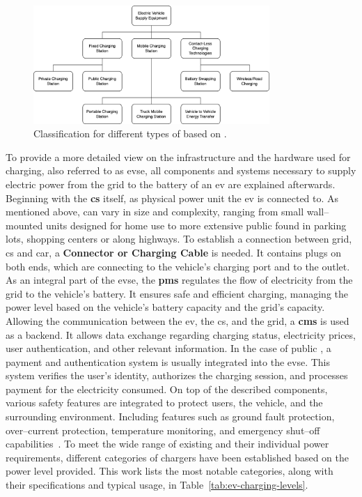 \begin{figure}[h]
\centering
\includegraphics[width=0.8\textwidth,keepaspectratio]{resources/images/main/1_fundamentals/ChargingStationClassification.png}
\caption{Classification for different types of  based on \cite{afshar_literature_2020}.}
\label{fig:charging-station-classification}
\end{figure}

\noindent To provide a more detailed view on the infrastructure and the hardware used for charging, also referred to as \acrfull{evse}, all components and systems necessary to supply electric power from the grid to the battery of an \acrfull{ev} are explained afterwards.
Beginning with the \textbf{\acrfull{cs}} itself, as physical power unit the \acrshort{ev} is connected to. As mentioned above,  can vary in size and complexity, ranging from small wall--mounted units designed for home use to more extensive public  found in parking lots, shopping centers or along highways. 
To establish a connection between grid, \acrshort{cs} and car, a \textbf{Connector or Charging Cable} is needed. It contains plugs on both ends, which are connecting to the vehicle's charging port and to the  outlet. 
As an integral part of the \acrshort{evse}, the \textbf{\acrshort{pms}} regulates the flow of electricity from the grid to the vehicle's battery. It ensures safe and efficient charging, managing the power level based on the vehicle's battery capacity and the grid's capacity.
Allowing the communication between the \acrshort{ev}, the \acrfull{cs}, and the grid, a \textbf{\acrshort{cms}} is used as a backend. It allows data exchange regarding charging status, electricity prices, user authentication, and other relevant information.
In the case of public , a payment and authentication system is usually integrated into the \acrshort{evse}. This system verifies the user's identity, authorizes the charging session, and processes payment for the electricity consumed.
On top of the described components, various safety features are integrated to protect users, the vehicle, and the surrounding environment. Including features such as ground fault protection, over--current protection, temperature monitoring, and emergency shut--off capabilities~\cite{littlefuse_designing_2020}.
\noindent To meet the wide range of existing  and their individual power requirements, different categories of chargers have been established based on the power level provided. This work lists the most notable categories, along with their specifications and typical usage, in Table~\ref{tab:ev-charging-levels}. 

